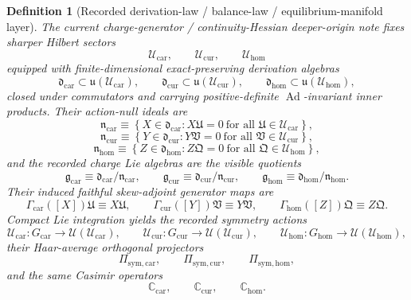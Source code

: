 \documentclass[11pt]{article}
\newcommand{\RootTensorClass}{\mathscr U_{\mathrm{car}}}
\newcommand{\RootRelabelClass}{\mathscr U_{\mathrm{cur}}}
\newcommand{\RootFreeClass}{\mathscr U_{\mathrm{hom}}}
\newcommand{\RootTensor}{\mathfrak U}
\newcommand{\RootRelabel}{\mathfrak V}
\newcommand{\RootFree}{\mathfrak Q}
\newcommand{\TensorSymProj}{\Pi_{\mathrm{sym,car}}}
\newcommand{\CurSymProj}{\Pi_{\mathrm{sym,cur}}}
\newcommand{\HomSymProj}{\Pi_{\mathrm{sym,hom}}}
\newcommand{\TensorSymGroup}{G_{\mathrm{car}}}
\newcommand{\CurSymGroup}{G_{\mathrm{cur}}}
\newcommand{\HomSymGroup}{G_{\mathrm{hom}}}
\newcommand{\TensorSymAct}{\mathscr U_{\mathrm{car}}}
\newcommand{\CurSymAct}{\mathscr U_{\mathrm{cur}}}
\newcommand{\HomSymAct}{\mathscr U_{\mathrm{hom}}}
\newcommand{\TensorChargeAlg}{\mathfrak g_{\mathrm{car}}}
\newcommand{\CurChargeAlg}{\mathfrak g_{\mathrm{cur}}}
\newcommand{\HomChargeAlg}{\mathfrak g_{\mathrm{hom}}}
\newcommand{\TensorGen}{\Gamma_{\mathrm{car}}}
\newcommand{\CurGen}{\Gamma_{\mathrm{cur}}}
\newcommand{\HomGen}{\Gamma_{\mathrm{hom}}}
\newcommand{\TensorCasimir}{\mathbb C_{\mathrm{car}}}
\newcommand{\CurCasimir}{\mathbb C_{\mathrm{cur}}}
\newcommand{\HomCasimir}{\mathbb C_{\mathrm{hom}}}
\newcommand{\TensorDerAlg}{\mathfrak d_{\mathrm{car}}}
\newcommand{\CurDerAlg}{\mathfrak d_{\mathrm{cur}}}
\newcommand{\HomDerAlg}{\mathfrak d_{\mathrm{hom}}}
\newcommand{\TensorActNull}{\mathfrak n_{\mathrm{car}}}
\newcommand{\CurActNull}{\mathfrak n_{\mathrm{cur}}}
\newcommand{\HomActNull}{\mathfrak n_{\mathrm{hom}}}
\newtheorem{definition}{Definition}
\begin{document}
\begin{definition}[Recorded derivation-law / balance-law / equilibrium-manifold layer]
\label{def:recorded_layer}
The current charge-generator / continuity-Hessian deeper-origin note fixes sharper Hilbert sectors
\[
\RootTensorClass,\qquad
\RootRelabelClass,\qquad
\RootFreeClass
\]
equipped with finite-dimensional exact-preserving derivation algebras
\[
\TensorDerAlg\subset\mathfrak u(\RootTensorClass),\qquad
\CurDerAlg\subset\mathfrak u(\RootRelabelClass),\qquad
\HomDerAlg\subset\mathfrak u(\RootFreeClass),
\]
closed under commutators and carrying positive-definite \(\operatorname{Ad}\)-invariant inner products. Their action-null ideals are
\begin{equation}
\TensorActNull
\equiv
\left\{
X\in\TensorDerAlg: X\RootTensor=0 \ \text{for all }\RootTensor\in\RootTensorClass
\right\},
\label{eq:recorded_null_car}
\end{equation}
\begin{equation}
\CurActNull
\equiv
\left\{
Y\in\CurDerAlg: Y\RootRelabel=0 \ \text{for all }\RootRelabel\in\RootRelabelClass
\right\},
\label{eq:recorded_null_cur}
\end{equation}
\begin{equation}
\HomActNull
\equiv
\left\{
Z\in\HomDerAlg: Z\RootFree=0 \ \text{for all }\RootFree\in\RootFreeClass
\right\},
\label{eq:recorded_null_hom}
\end{equation}
and the recorded charge Lie algebras are the visible quotients
\begin{equation}
\TensorChargeAlg\equiv\TensorDerAlg/\TensorActNull,\qquad
\CurChargeAlg\equiv\CurDerAlg/\CurActNull,\qquad
\HomChargeAlg\equiv\HomDerAlg/\HomActNull.
\label{eq:recorded_charge_quotients}
\end{equation}
Their induced faithful skew-adjoint generator maps are
\begin{equation}
\TensorGen([X])\RootTensor\equiv X\RootTensor,\qquad
\CurGen([Y])\RootRelabel\equiv Y\RootRelabel,\qquad
\HomGen([Z])\RootFree\equiv Z\RootFree.
\label{eq:recorded_generator_maps}
\end{equation}
Compact Lie integration yields the recorded symmetry actions
\[
\TensorSymAct:\TensorSymGroup\to\mathcal U(\RootTensorClass),\qquad
\CurSymAct:\CurSymGroup\to\mathcal U(\RootRelabelClass),\qquad
\HomSymAct:\HomSymGroup\to\mathcal U(\RootFreeClass),
\]
their Haar-average orthogonal projectors
\[
\TensorSymProj,\qquad
\CurSymProj,\qquad
\HomSymProj,
\]
and the same Casimir operators
\[
\TensorCasimir,\qquad
\CurCasimir,\qquad
\HomCasimir.
\]


\end{definition}
\end{document}
